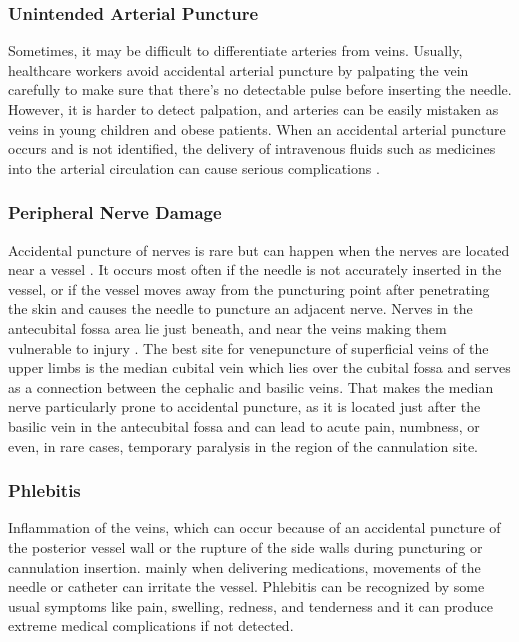 
\subsubsection{Unintended Arterial Puncture}
Sometimes, it may be difficult to differentiate arteries from veins. Usually, healthcare workers avoid accidental arterial puncture by palpating the vein carefully to make sure that there's no detectable pulse before inserting the needle. 
However, it is harder to detect palpation, and arteries can be easily mistaken as veins in young children and obese patients. When an accidental arterial puncture occurs and is not identified, the delivery of intravenous fluids such as medicines into the arterial circulation can cause serious complications \parencite{comlicationsVeni3}.

\subsubsection{Peripheral Nerve Damage}
Accidental puncture of nerves is rare but can happen when the nerves are located near a vessel \parencite{comlicationsVeni4}. It occurs most often if the needle is not accurately inserted in the vessel, or if the vessel moves away from the puncturing point after penetrating the skin and causes the needle to puncture an adjacent nerve. Nerves in the antecubital fossa area lie just beneath, and near the veins making them vulnerable to injury \parencite{comlicationsVeni4}.
The best site for venepuncture of superficial veins of the upper limbs is the median cubital vein which lies over the cubital fossa and serves as a connection between the cephalic and basilic veins. That makes the median nerve particularly prone to accidental puncture, as it is located just after the basilic vein in the antecubital fossa and can lead to acute pain, numbness, or even, in rare cases, temporary paralysis in the region of the cannulation site.

\subsubsection{Phlebitis}
Inflammation of the veins, which can occur because of an accidental puncture of the posterior vessel wall or the rupture of the side walls during puncturing or cannulation insertion. mainly when delivering medications, movements of the needle or catheter can irritate the vessel. Phlebitis can be recognized by some usual symptoms like pain, swelling, redness, and tenderness and it can produce extreme medical complications if not detected. 


